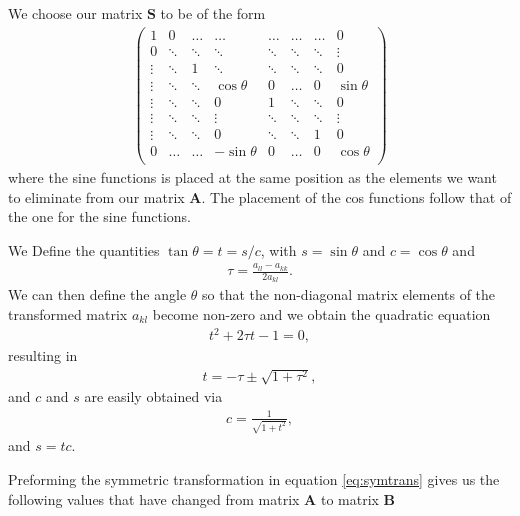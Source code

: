 \documentclass[11pt, a4paper]{article}
\begin{document}
We choose our matrix $\mathbf{S}$ to be of the form
\begin{gather}
\begin{pmatrix}
1 & 0 & \dots & \dots & \dots & \dots & \dots& 0\\
0 & \ddots & \ddots & \ddots & \ddots & \ddots & \ddots & \vdots\\
\vdots & \ddots & 1 & \ddots& \ddots & \ddots & \ddots &0\\
\vdots & \ddots & \ddots & \cos \theta & 0 & \dots & 0 & \sin \theta \\
\vdots & \ddots & \ddots & 0 & 1 & \ddots & \ddots & 0 \\
\vdots & \ddots & \ddots & \vdots & \ddots & \ddots & \ddots & \vdots \\
\vdots & \ddots & \ddots & 0 & \ddots & \ddots & 1 & 0 \\
0 & \dots & \dots & -\sin \theta & 0 & \dots & 0 & \cos \theta \\
\end{pmatrix}
\end{gather} 
where the sine functions is placed at the same position as the elements we want to eliminate from our matrix $\mathbf{A}$. The placement of the cos functions follow that of the one for the sine functions.

We 
Define the quantities $\tan\theta = t= s/c$, with $s=\sin\theta$ and $c=\cos\theta$ and
\begin{gather}
\tau = \frac{a_{ll}-a_{kk}}{2a_{kl}}.
\end{gather}
We can then define the angle $\theta$ so that the non-diagonal matrix elements of the transformed matrix 
$a_{kl}$ become non-zero and
we obtain the quadratic equation
\begin{gather}
t^2+2\tau t-1= 0,
\end{gather}
resulting in 
\begin{gather}
  t = -\tau \pm \sqrt{1+\tau^2},
\end{gather}
and $c$ and $s$ are easily obtained via
\begin{gather}
   c = \frac{1}{\sqrt{1+t^2}},
\end{gather}
and $s=tc$. 

Preforming the symmetric transformation in equation \eqref{eq:symtrans} gives us the following values that have changed from matrix $\mathbf{A}$ to matrix $\mathbf{B}$ 
\end{document}
